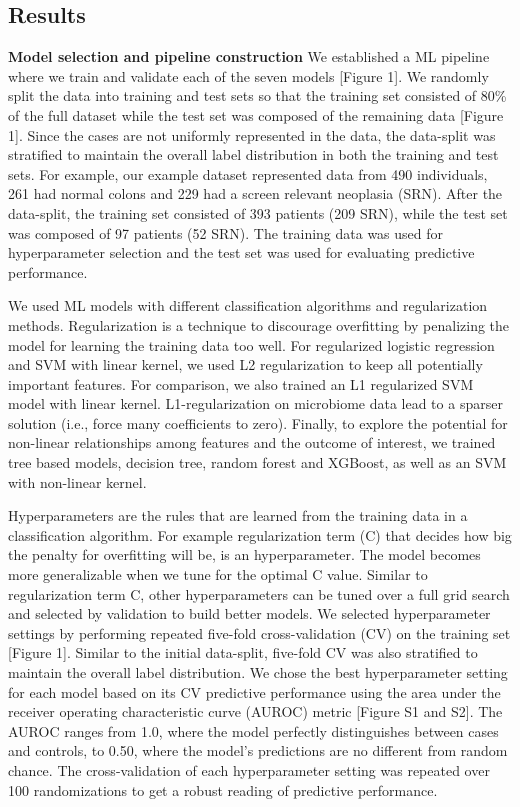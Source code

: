 \documentclass[11pt,]{article}
\begin{document}
\subsection{Results}\label{results}

\textbf{Model selection and pipeline construction} We established a ML
pipeline where we train and validate each of the seven models {[}Figure
1{]}. We randomly split the data into training and test sets so that the
training set consisted of 80\% of the full dataset while the test set
was composed of the remaining data {[}Figure 1{]}. Since the cases are
not uniformly represented in the data, the data-split was stratified to
maintain the overall label distribution in both the training and test
sets. For example, our example dataset represented data from 490
individuals, 261 had normal colons and 229 had a screen relevant
neoplasia (SRN). After the data-split, the training set consisted of 393
patients (209 SRN), while the test set was composed of 97 patients (52
SRN). The training data was used for hyperparameter selection and the
test set was used for evaluating predictive performance.

We used ML models with different classification algorithms and
regularization methods. Regularization is a technique to discourage
overfitting by penalizing the model for learning the training data too
well. For regularized logistic regression and SVM with linear kernel, we
used L2 regularization to keep all potentially important features. For
comparison, we also trained an L1 regularized SVM model with linear
kernel. L1-regularization on microbiome data lead to a sparser solution
(i.e., force many coefficients to zero). Finally, to explore the
potential for non-linear relationships among features and the outcome of
interest, we trained tree based models, decision tree, random forest and
XGBoost, as well as an SVM with non-linear kernel.

Hyperparameters are the rules that are learned from the training data in
a classification algorithm. For example regularization term (C) that
decides how big the penalty for overfitting will be, is an
hyperparameter. The model becomes more generalizable when we tune for
the optimal C value. Similar to regularization term C, other
hyperparameters can be tuned over a full grid search and selected by
validation to build better models. We selected hyperparameter settings
by performing repeated five-fold cross-validation (CV) on the training
set {[}Figure 1{]}. Similar to the initial data-split, five-fold CV was
also stratified to maintain the overall label distribution. We chose the
best hyperparameter setting for each model based on its CV predictive
performance using the area under the receiver operating characteristic
curve (AUROC) metric {[}Figure S1 and S2{]}. The AUROC ranges from 1.0,
where the model perfectly distinguishes between cases and controls, to
0.50, where the model's predictions are no different from random chance.
The cross-validation of each hyperparameter setting was repeated over
100 randomizations to get a robust reading of predictive performance.
\end{document}
